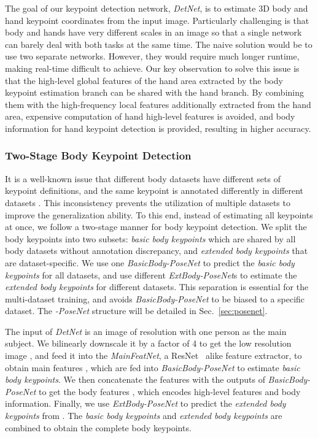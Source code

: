 \documentclass[final]{cvpr}
\begin{document}
\label{sec:DetNet}
The goal of our keypoint detection network, \textit{DetNet}, is to estimate 3D body and hand keypoint coordinates from the input image.
Particularly challenging is that body and hands have very different scales in an image so that a single network can barely deal with both tasks at the same time.
The naive solution would be to use two separate networks.
However, they would require much longer runtime, making real-time difficult to achieve.
Our key observation to solve this issue is that the high-level global features of the hand area extracted by the body keypoint estimation branch can be shared with the hand branch.
By combining them with the high-frequency local features additionally extracted from the hand area, expensive computation of hand high-level features is avoided, and body information for hand keypoint detection is provided, resulting in higher accuracy.
\par
\vspace{-3mm}
\subsubsection{Two-Stage Body Keypoint Detection\vspace{-1mm}}
It is a well-known issue that different body datasets have different sets of keypoint definitions, and the same keypoint is annotated differently in different datasets \cite{joo2018total}.
This inconsistency prevents the utilization of multiple datasets to improve the generalization ability.
To this end, instead of estimating all keypoints at once, we follow a two-stage manner for body keypoint detection.
We split the body keypoints into two subsets: \textit{basic body keypoints} which are shared by all body datasets without annotation discrepancy, and \textit{extended body keypoints} that are dataset-specific.
We use one \textit{BasicBody-PoseNet} to predict the \textit{basic body keypoints} for all datasets, and use different \textit{ExtBody-PoseNet}s to estimate the \textit{extended body keypoints} for different datasets.
This separation is essential for the multi-dataset training, and avoids \textit{BasicBody-PoseNet} to be biased to a specific dataset.
The \textit{-PoseNet} structure will be detailed in Sec.~\ref{sec:posenet}.
\par
The input of \textit{DetNet} is an image  of resolution  with one person as the main subject.
We bilinearly downscale it by a factor of 4 to get the low resolution image , and feed it into the \textit{MainFeatNet}, a ResNet~\cite{he2016deep} alike feature extractor, to obtain main features , which are fed into \textit{BasicBody-PoseNet} to estimate \textit{basic body keypoints}.
We then concatenate the features  with the outputs of \textit{BasicBody-PoseNet} to get the body features , which encodes high-level features and body information.
Finally, we use \textit{ExtBody-PoseNet} to predict the \textit{extended body keypoints} from .
The \textit{basic body keypoints} and \textit{extended body keypoints} are combined to obtain the complete body keypoints.
\par
\vspace{-3mm}
\end{document}
